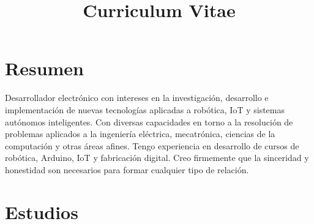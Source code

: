 \documentclass[11pt,a4paper,roman]{moderncv} %
\title{Curriculum Vitae}
\begin{document}
\makecvtitle %
\section{Resumen}
Desarrollador electr\'onico con intereses en la investigaci\'on, desarrollo e implementaci\'on de nuevas tecnolog\'ias aplicadas a rob\'otica, IoT y sistemas aut\'onomos inteligentes. Con diversas capacidades en torno a la resoluci\'on de problemas aplicados a la ingenier\'ia el\'ectrica, mecatr\'onica, ciencias de la computaci\'on y otras \'areas afines. Tengo experiencia en desarrollo de cursos de rob\'otica, Arduino, IoT y fabricaci\'on digital.
Creo firmemente que la sinceridad y honestidad son necesarios para formar cualquier tipo de relaci\'on.



\section{Estudios}




\end{document}
